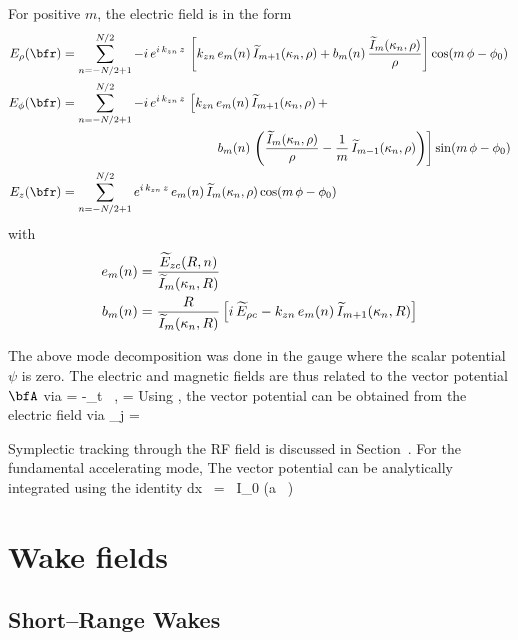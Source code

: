 For positive $m$, the electric field is in the form
\begin{align}
  E_\rho(\bfr) &= \sum_{n=-N/2+1}^{N/2}
    -i \, e^{i \, k_{zn} \, z} \, 
    \left[ 
    k_{zn} \, e_m(n) \, \wt I_{m+1}(\kappa_n, \rho) +
    b_m(n) \, \frac{\wt I_m(\kappa_n, \rho)}{\rho}
    \right]
    \cos(m \, \phi - \phi_0) \CRNO
  E_\phi(\bfr) &= \sum_{n=-N/2+1}^{N/2} 
    -i \, e^{i \, k_{zn} \, z} \, 
    \left[
    k_{zn} \, e_m(n) \, \wt I_{m+1}(\kappa_n, \rho) \, + \right. \\
  & \left. \qquad \qquad \qquad \qquad \qquad \qquad
    b_m(n) \, \left( \frac{\wt I_m(\kappa_n, \rho)}{\rho} - 
    \frac{1}{m} \, \wt I_{m-1}(\kappa_n, \rho) \right)
    \right] 
    \sin(m \, \phi - \phi_0) \CRNO
  E_z(\bfr) &= \sum_{n=-N/2+1}^{N/2}e^{i \, k_{zn} \, z} \, 
    e_m(n) \, \wt I_m(\kappa_n, \rho) \cos(m \, \phi - \phi_0) \nonumber
\end{align}
with
\begin{align}
  e_m(n) &= \frac{\widetilde E_{zc}(R, n)}{\widetilde I_m(\kappa_n, R)} \nonumber \\
  b_m(n) &= \frac{R}{\widetilde I_m(\kappa_n, R)} \left[
    i \, \widetilde E_{\rho c} - k_{zn} \, e_m(n) \, \widetilde I_{m+1}(\kappa_n, R)
    \right]
\end{align}

The above mode decomposition was done in the gauge where the scalar
potential $\psi$ is zero. The electric and magnetic fields are thus
related to the vector potential $\bfA$ via
\Begineq
  \bfE = -\partial_t \, \bfA, \qquad \bfB = \nabla \times \bfA
\Endeq
Using , the vector potential can be obtained from the
electric field via
\Begineq
  \bfA_j = 
  \label{aiew}
\Endeq
 
Symplectic tracking through the RF field is discussed in
Section~.  For the fundamental accelerating mode,
The vector potential can be analytically integrated using the identity
\Begineq
  \int dx \,  = 
   \, I_0 (a \, )
\Endeq

\section{Wake fields}
\label{s:wake.fields}

\subsection{Short--Range Wakes}

